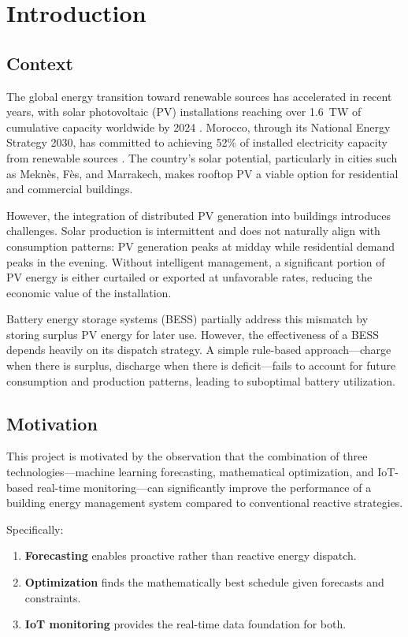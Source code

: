 \chapter{Introduction}
\label{ch:introduction}

\section{Context}

The global energy transition toward renewable sources has accelerated in recent years, with solar photovoltaic (PV) installations reaching over 1.6~TW of cumulative capacity worldwide by 2024 \cite{irena2023}. Morocco, through its National Energy Strategy 2030, has committed to achieving 52\% of installed electricity capacity from renewable sources \cite{morocco_energy}. The country's solar potential, particularly in cities such as Meknès, Fès, and Marrakech, makes rooftop PV a viable option for residential and commercial buildings.

However, the integration of distributed PV generation into buildings introduces challenges. Solar production is intermittent and does not naturally align with consumption patterns: PV generation peaks at midday while residential demand peaks in the evening. Without intelligent management, a significant portion of PV energy is either curtailed or exported at unfavorable rates, reducing the economic value of the installation.

Battery energy storage systems (BESS) partially address this mismatch by storing surplus PV energy for later use. However, the effectiveness of a BESS depends heavily on its dispatch strategy. A simple rule-based approach---charge when there is surplus, discharge when there is deficit---fails to account for future consumption and production patterns, leading to suboptimal battery utilization.

\section{Motivation}

This project is motivated by the observation that the combination of three technologies---machine learning forecasting, mathematical optimization, and IoT-based real-time monitoring---can significantly improve the performance of a building energy management system compared to conventional reactive strategies.

Specifically:
\begin{enumerate}[nosep]
    \item \textbf{Forecasting} enables proactive rather than reactive energy dispatch.
    \item \textbf{Optimization} finds the mathematically best schedule given forecasts and constraints.
    \item \textbf{IoT monitoring} provides the real-time data foundation for both.
\end{enumerate}

